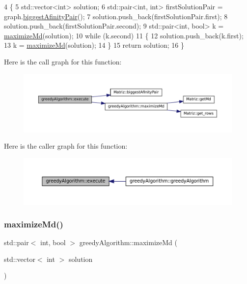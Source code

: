\begin{DoxyCode}
4 \{
5   std::vector<int> solution;
6   std::pair<int, int> firstSolutionPair = graph.\hyperlink{classMatriz_a30e8aba7a2868aaa98f11d3037ff8319}{biggestAfinityPair}();
7   solution.push\_back(firstSolutionPair.first);
8   solution.push\_back(firstSolutionPair.second);
9   std::pair<int, bool> k = \hyperlink{classgreedyAlgorithm_a4968e1371d2fdfb1b1b6f24b57dd1f07}{maximizeMd}(solution);
10   \textcolor{keywordflow}{while} (k.second)
11   \{
12     solution.push\_back(k.first);
13     k = \hyperlink{classgreedyAlgorithm_a4968e1371d2fdfb1b1b6f24b57dd1f07}{maximizeMd}(solution);
14   \}
15   \textcolor{keywordflow}{return} solution;
16 \}
\end{DoxyCode}
Here is the call graph for this function\+:\nopagebreak
\begin{figure}[H]
\begin{center}
\leavevmode
\includegraphics[width=350pt]{classgreedyAlgorithm_a37c81600b24a32ae25b6f0eeab643a7a_cgraph}
\end{center}
\end{figure}
Here is the caller graph for this function\+:\nopagebreak
\begin{figure}[H]
\begin{center}
\leavevmode
\includegraphics[width=350pt]{classgreedyAlgorithm_a37c81600b24a32ae25b6f0eeab643a7a_icgraph}
\end{center}
\end{figure}
\mbox{\label{classgreedyAlgorithm_a4968e1371d2fdfb1b1b6f24b57dd1f07}} 
\subsubsection{\texorpdfstring{maximize\+Md()}{maximizeMd()}}
{\footnotesize\ttfamily std\+::pair$<$ int, bool $>$ greedy\+Algorithm\+::maximize\+Md (\begin{DoxyParamCaption}\item[{std\+::vector$<$ int $>$}]{solution }\end{DoxyParamCaption})}



